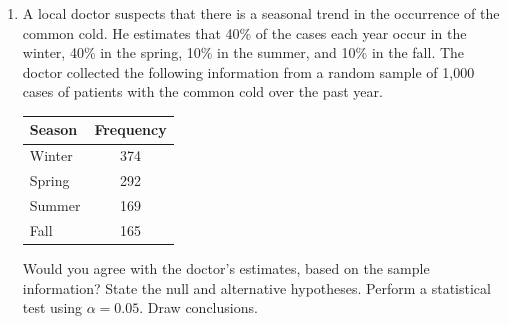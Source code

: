 \documentclass[11pt]{article}
\begin{document}
\begin{enumerate}
\begin{enumerate}
\item Calculate, by hand, Welch's two-sample t-statistic and perform a hypothesis test 
to find out whether the observed difference in the sample means is good evidence that
polyester decays more in 16 weeks than in 2 weeks. Use $\alpha=0.05$.
State $H_0$ and $H_a$ in terms of appropriate \texttt{population parameters you 
define and label clearly}. Interpret your findings and show your work.
\item Compute a 90\% confidence interval for the difference
in population means you defined in part (b) for the two populations assuming 
unequal population variances.
\item Report evidence you find from your output (a) for supporting the normality assumption 
of the two samples, and (b) for supporting the conclusion that the population variances are not 
equal.
\item The t-statistic for testing the hypothesis you stated in Part (b) 
under the unequal variances assumption can be computed in a statistical software (for example SAS or R). Circle it in your output and copy here the statistic and the p-value associated 
with it extracted from the output.
\item  Extract the  90\% confidence interval for the difference in population 
means as in Part (c) computed under unequal 
variances assumption from the output. Copy it here and
circle it in the output.
\end{enumerate}
\item A local doctor suspects that there is a seasonal trend in the occurrence of the common cold. He estimates that 40\% of the cases each year occur in the winter, 40\% in the spring, 10\% in the summer, and 10\% in the fall. The doctor collected the following information from a random sample of 1,000 cases of patients with the common cold over the past year. 
\begin{center}
\begin{tabular}{|l|c|} \hline
Season & Frequency \\ \hline
Winter & 374\\ \hline
Spring & 292\\ \hline
Summer & 169\\ \hline
Fall & 165\\ \hline
\end{tabular}
\end{center}
Would you agree with the doctor's estimates, based on the sample information? State the null and alternative hypotheses. Perform a statistical test using $\alpha=0.05$. Draw conclusions.

\end{enumerate}
\end{document}
